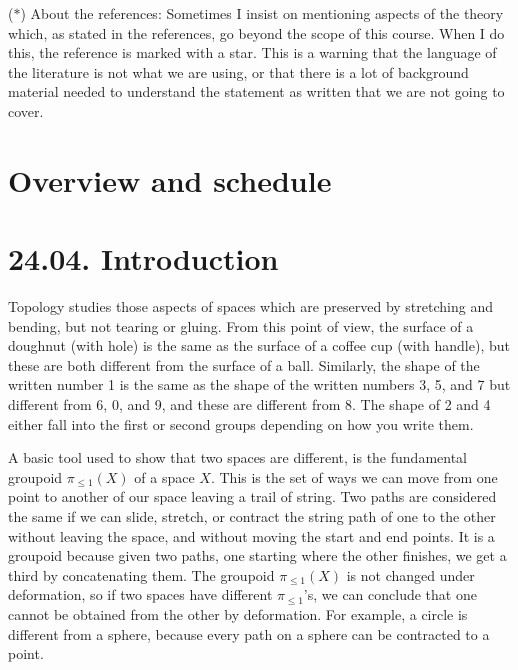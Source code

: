 \documentclass[a4paper]{amsart}
\numberwithin{figure}{section}
\theoremstyle{theorem}
\theoremstyle{definition}
\begin{document}
($*$) About the references: Sometimes I insist on mentioning aspects of the theory which, as stated in the references, go beyond the scope of this course. When I do this, the reference is marked with a star. This is a warning that the language of the literature is not what we are using, or that there is a lot of background material needed to understand the statement as written that we are not going to cover.

\section*{Overview and schedule}

\section{24.04. Introduction}

Topology studies those aspects of spaces which are preserved by stretching and bending, but not tearing or gluing. From this point of view, the surface of a doughnut (with hole) is the same as the surface of a coffee cup (with handle), but these are both different from the surface of a ball. Similarly, the shape of the written number 1 is the same as the shape of the written numbers 3, 5, and 7 but different from 6, 0, and 9, and these are different from 8. The shape of 2 and 4 either fall into the first or second groups depending on how you write them.

A basic tool used to show that two spaces are different, is the fundamental groupoid $\pi_{\leq 1}(X)$ of a space $X$. This is the set of ways we can move from one point to another of our space leaving a trail of string. Two paths are considered the same if we can slide, stretch, or contract the string path of one to the other without leaving the space, and without moving the start and end points. It is a groupoid because given two paths, one starting where the other finishes, we get a third by concatenating them. The groupoid $\pi_{\leq 1}(X)$ is not changed under deformation, so if two spaces have different $\pi_{\leq 1}$'s, we can conclude that one cannot be obtained from the other by deformation. For example, a circle is different from a sphere, because every path on a sphere can be contracted to a point.

\end{document}
